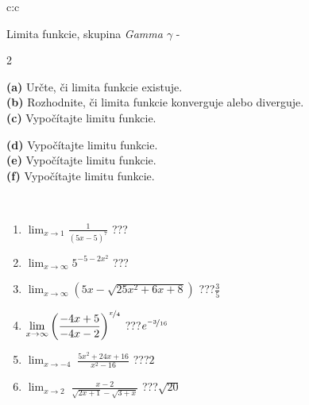 \documentclass[10pt]{report}
\begin{document}
\newpage
\thispagestyle{empty}
\begin{tabular}{c:c}
\begin{minipage}[c][104.5mm][t]{0.5\linewidth}
\begin{center}
\vspace{7mm}
{\huge Limita funkcie, skupina \textit{Gamma $\gamma$} -}\\[5mm]
\begin{minipage}{0.95\linewidth}
\begin{center}
{\small \begin{multicols}{2} \raggedright
\textbf{(a)} Určte, či limita funkcie existuje. \\[1mm]
\textbf{(b)} Rozhodnite, či limita funkcie konverguje alebo diverguje. \\[1mm]
\textbf{(c)} Vypočítajte limitu funkcie. \par \columnbreak
\textbf{(d)} Vypočítajte limitu funkcie. \\[1mm]
\textbf{(e)} Vypočítajte limitu funkcie. \\[1mm]
\textbf{(f)} Vypočítajte limitu funkcie. \\[1mm]
\end{multicols}
}
\end{center}
\end{minipage}
\\[4mm]
\begin{minipage}{0.79\linewidth}
\begin{center}
\begin{varwidth}{\linewidth}
\begin{enumerate}
\normalsize
\item $\displaystyle\lim_{x\to1}{\frac{1}{(5x-5)^{7}}}$\quad \dotfill\; ???\;\dotfill \quad {}
\item $\displaystyle\lim_{x\to\infty}{5^{-5-2x^2}}$\quad \dotfill\; ???\;\dotfill \quad {}
\item $\displaystyle\lim_{x\to\infty}{\left(5x - \sqrt{25x^2+6x+8}\right)}$\quad \dotfill\; ???\;\dotfill \quad $\frac{3}{5}$
\item $\displaystyle\lim_{x\to\infty}{\left( \frac{-4x+5}{-4x-2} \right)^{\nicefrac{x}{4}}}$\quad \dotfill\; ???\;\dotfill \quad $e^{\nicefrac{-3}{16}}$
\item $\displaystyle\lim_{x\to -4}{\;\frac{5x^2+24x+16}{x^2-16}}$\quad \dotfill\; ???\;\dotfill \quad $2$
\item $\displaystyle\lim_{x\to 2}{\;\frac{x-2}{\sqrt{2x+1} - \sqrt{3+x}}}$\quad \dotfill\; ???\;\dotfill \quad $\sqrt{20}$

\end{enumerate}
\end{varwidth}
\end{center}
\end{minipage}
\end{center}
\end{minipage}
\end{tabular}
\end{document}
